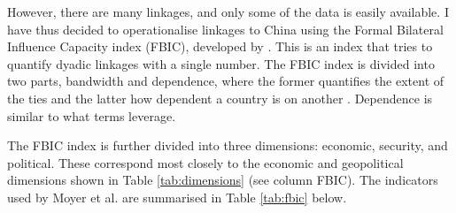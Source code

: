 \begin{table}[hbt!]
\centering
\caption{Five dimensions of linkages}
\label{tab:dimensions}
\vspace{0.5em}
\end{table}

However, there are many linkages, and only some of the data is easily available. I have thus decided to operationalise linkages to China using the Formal Bilateral Influence Capacity index (FBIC), developed by \citet{moyer_china-us_2021}. This is an index that tries to quantify dyadic linkages with a single number. The FBIC index is divided into two parts, bandwidth and dependence, where the former quantifies the extent of the ties and the latter how dependent a country is on another \citep[p. 7]{moyer_china-us_2021}. Dependence is similar to what \citep{levitsky_linkage_2006} terms leverage.

The FBIC index is further divided into three dimensions: economic, security, and political. These correspond most closely to the economic and geopolitical dimensions shown in Table \ref{tab:dimensions} (see column FBIC). The indicators used by Moyer et al. are summarised in Table \ref{tab:fbic} below.


